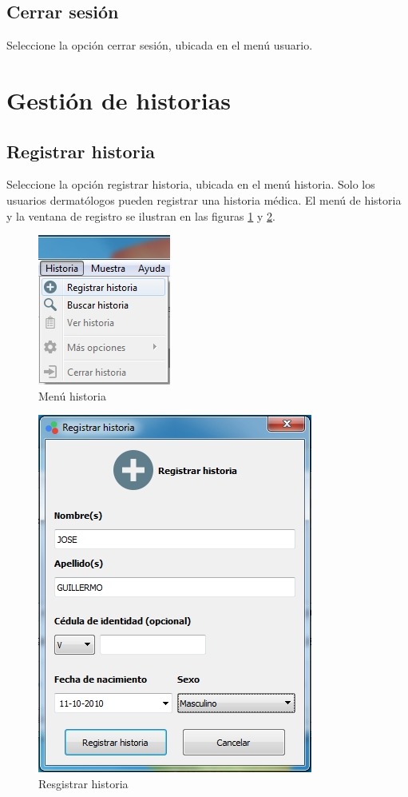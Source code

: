 	\subsection*{Cerrar sesi\'{o}n}
	
	Seleccione la opci\'{o}n cerrar sesi\'{o}n, ubicada en el men\'{u} usuario.

\newpage

\section*{Gesti\'{o}n de historias}

	\subsection*{Registrar historia}
	
	Seleccione la opci\'{o}n registrar historia, ubicada en el men\'{u} historia. Solo los usuarios dermat\'{o}logos pueden registrar una historia m\'{e}dica. El men\'{u} de historia y la ventana de registro se ilustran en las figuras \ref{fig:menu-historia} y \ref{fig:registrar-historia}.

\begin{figure}[H]
  \centering
  \includegraphics[width=.3\linewidth]{./img/menu-historia.jpg}
\caption[]{Men\'{u} historia\label{fig:menu-historia}}
\end{figure}

\begin{figure}[H]
  \centering
  \includegraphics[width=.4\linewidth]{./img/registrar-historia.jpg}
\caption[]{Resgistrar historia\label{fig:registrar-historia}}
\end{figure}

